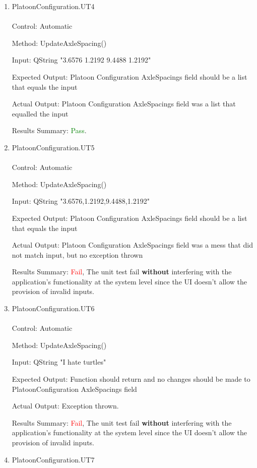 \documentclass[12pt, titlepage]{article}
\begin{document}
\begin{enumerate}
\item{PlatoonConfiguration.UT4}\\\\
  Control: Automatic

  Method: UpdateAxleSpacing()

  Input: QString "3.6576 1.2192 9.4488 1.2192"

  Expected Output: Platoon Configuration AxleSpacings field should be a list that equals the input

  Actual Output: Platoon Configuration AxleSpacings field was a list that equalled the input

  Results Summary: \textcolor{green} {Pass}.
\item{PlatoonConfiguration.UT5}\\\\
  Control: Automatic

  Method: UpdateAxleSpacing()

  Input: QString "3.6576,1.2192,9.4488,1.2192"

  Expected Output: Platoon Configuration AxleSpacings field should be a list that equals the input

  Actual Output: Platoon Configuration AxleSpacings field was a mess that did not match input, but no exception thrown

  Results Summary: \textcolor{red} {Fail}, The unit test fail
\textbf{without} interfering with the application’s functionality at the system level
since the UI doesn’t allow the provision of invalid inputs.

  \item{PlatoonConfiguration.UT6}\\\\
  Control: Automatic

  Method: UpdateAxleSpacing()

  Input: QString "I hate turtles"

  Expected Output: Function should return and no changes should be made to PlatoonConfiguration AxleSpacings field

  Actual Output: Exception thrown.

  Results Summary: \textcolor{red} {Fail}, The unit test fail
\textbf{without} interfering with the application’s functionality at the system level
since the UI doesn’t allow the provision of invalid inputs.
  \item{PlatoonConfiguration.UT7}\label{PlatoonConfiguration.UT7}\\
  

\end{enumerate}
\end{document}
